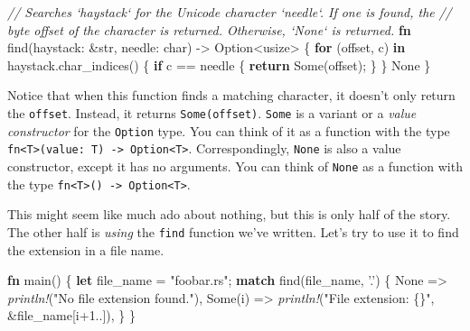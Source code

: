 \documentclass[a4paper,]{book}
\renewcommand*{\hypertarget}[3][\ar]{%
  \def\ar{#2}%
  \label{#1}%
  #3}
\newenvironment{Shaded}{\begin{snugshade}}{\end{snugshade}}
\newcommand{\KeywordTok}[1]{\textcolor[rgb]{0.13,0.29,0.53}{\textbf{{#1}}}}
\newcommand{\DataTypeTok}[1]{\textcolor[rgb]{0.13,0.29,0.53}{{#1}}}
\newcommand{\DecValTok}[1]{\textcolor[rgb]{0.00,0.00,0.81}{{#1}}}
\newcommand{\ConstantTok}[1]{\textcolor[rgb]{0.00,0.00,0.00}{{#1}}}
\newcommand{\CharTok}[1]{\textcolor[rgb]{0.31,0.60,0.02}{{#1}}}
\newcommand{\StringTok}[1]{\textcolor[rgb]{0.31,0.60,0.02}{{#1}}}
\newcommand{\CommentTok}[1]{\textcolor[rgb]{0.56,0.35,0.01}{\textit{{#1}}}}
\newcommand{\PreprocessorTok}[1]{\textcolor[rgb]{0.56,0.35,0.01}{\textit{{#1}}}}
\newcommand{\NormalTok}[1]{{#1}}
\begin{document}
\protect\hypertarget{code-option-ex-string-find}{}{}

\begin{Shaded}
\begin{Highlighting}[]
\CommentTok{// Searches `haystack` for the Unicode character `needle`. If one is found, the}
\CommentTok{// byte offset of the character is returned. Otherwise, `None` is returned.}
\KeywordTok{fn} \NormalTok{find(haystack: &}\DataTypeTok{str}\NormalTok{, needle: }\DataTypeTok{char}\NormalTok{) -> }\DataTypeTok{Option}\NormalTok{<}\DataTypeTok{usize}\NormalTok{> \{}
    \KeywordTok{for} \NormalTok{(offset, c) }\KeywordTok{in} \NormalTok{haystack.char_indices() \{}
        \KeywordTok{if} \NormalTok{c == needle \{}
            \KeywordTok{return} \ConstantTok{Some}\NormalTok{(offset);}
        \NormalTok{\}}
    \NormalTok{\}}
    \ConstantTok{None}
\NormalTok{\}}
\end{Highlighting}
\end{Shaded}

Notice that when this function finds a matching character, it doesn't
only return the \texttt{offset}. Instead, it returns
\texttt{Some(offset)}. \texttt{Some} is a variant or a \emph{value
constructor} for the \texttt{Option} type. You can think of it as a
function with the type
\texttt{fn\textless{}T\textgreater{}(value:\ T)\ -\textgreater{}\ Option\textless{}T\textgreater{}}.
Correspondingly, \texttt{None} is also a value constructor, except it
has no arguments. You can think of \texttt{None} as a function with the
type
\texttt{fn\textless{}T\textgreater{}()\ -\textgreater{}\ Option\textless{}T\textgreater{}}.

This might seem like much ado about nothing, but this is only half of
the story. The other half is \emph{using} the \texttt{find} function
we've written. Let's try to use it to find the extension in a file name.

\begin{Shaded}
\begin{Highlighting}[]
\KeywordTok{fn} \NormalTok{main() \{}
    \KeywordTok{let} \NormalTok{file_name = }\StringTok{"foobar.rs"}\NormalTok{;}
    \KeywordTok{match} \NormalTok{find(file_name, }\CharTok{'.'}\NormalTok{) \{}
        \ConstantTok{None} \NormalTok{=> }\PreprocessorTok{println!}\NormalTok{(}\StringTok{"No file extension found."}\NormalTok{),}
        \ConstantTok{Some}\NormalTok{(i) => }\PreprocessorTok{println!}\NormalTok{(}\StringTok{"File extension: \{\}"}\NormalTok{, &file_name[i+}\DecValTok{1.}\NormalTok{.]),}
    \NormalTok{\}}
\NormalTok{\}}
\end{Highlighting}
\end{Shaded}
\end{document}
